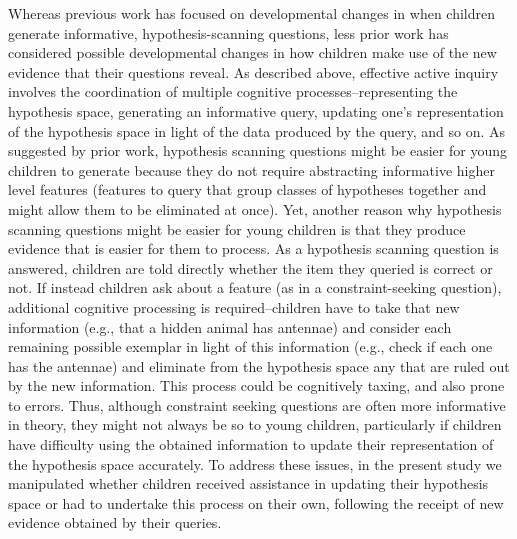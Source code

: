 \documentclass[man,floatsintext]{apa6}
\begin{document}
Whereas previous work has focused on developmental changes in when children generate informative, 
hypothesis-scanning questions, less prior work has considered possible developmental changes in how 
children make use of the new evidence that their questions reveal. As described above, effective active 
inquiry involves the coordination of multiple cognitive processes--representing the hypothesis space, 
generating an informative query, updating one's representation of the hypothesis space in light of the 
data produced by the query, and so on. As suggested by prior work, hypothesis scanning questions might 
be easier for young children to generate because they do not require abstracting informative higher level 
features (features to query that group classes of hypotheses together and might allow them to be eliminated 
at once). Yet, another reason why hypothesis scanning questions might be easier for young children is that they produce evidence that is easier for them to process. As a hypothesis scanning question is answered, children are told directly whether the item they queried is correct or not. If instead children ask about a feature (as in a constraint-seeking question), additional cognitive processing is required--children have to take that new information (e.g., that a hidden animal has antennae) and consider each remaining possible 
exemplar in light of this information (e.g., check if each one has the antennae) and eliminate from the 
hypothesis space any that are ruled out by the new information. This process could be cognitively taxing, 
and also prone to errors. Thus, although constraint seeking questions are often more informative in 
theory, they might not always be so to young children, particularly if children have difficulty using the 
obtained information to update their representation of the hypothesis space accurately. To address 
these issues, in the present study we manipulated whether children received assistance in updating 
their hypothesis space or had to undertake this process on their own, following the receipt of new 
evidence obtained by their queries. 


%
\end{document}
